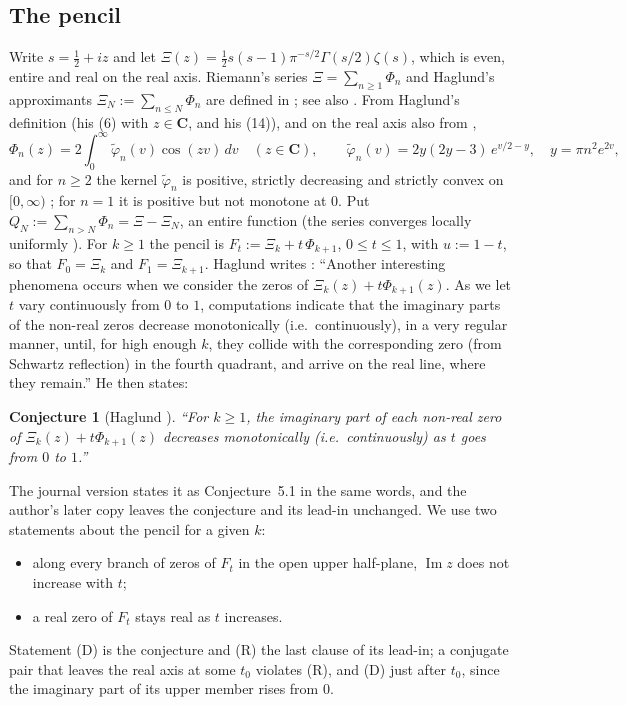 \documentclass[11pt]{article}
\theoremstyle{plain}
\newtheorem{conjecture}{Conjecture}
\theoremstyle{definition}
\theoremstyle{remark}
\newcommand{\Cx}{\mathbf{C}}
\newcommand{\im}{\operatorname{Im}}
\newcommand{\tphi}{\widetilde{\varphi}}
\begin{document}
\subsection{The pencil}\label{sec:pencil}
Write $s = \tfrac12 + iz$ and let
$\Xi(z) = \tfrac12 s(s-1)\pi^{-s/2}\Gamma(s/2)\zeta(s)$, which is even, entire
and real on the real axis. Riemann's series $\Xi = \sum_{n\ge1}\Phi_n$ and
Haglund's approximants $\Xi_N := \sum_{n \le N}\Phi_n$ are defined in
\cite[(1)--(14), pp.~1--3]{Hag}; see also \cite[(3)]{Tya}. From Haglund's definition (his (6) with
$z \in \Cx$, and his (14)), and on the real axis also from
\cite[Theorem~3.3 and its proof]{Tya},
\begin{equation}\label{eq:kernel}
\Phi_n(z) = 2\int_0^\infty \tphi_n(v)\cos(zv)\,dv \quad (z \in \Cx), \qquad
\tphi_n(v) = 2y(2y-3)\,e^{v/2 - y}, \quad y = \pi n^2 e^{2v},
\end{equation}
and for $n \ge 2$ the kernel $\tphi_n$ is positive, strictly decreasing and
strictly convex on $[0,\infty)$ \cite[proof of Theorem~3.3]{Tya}; for $n = 1$
it is positive but not monotone at $0$. Put
$Q_N := \sum_{n > N}\Phi_n = \Xi - \Xi_N$, an entire function (the series
converges locally uniformly \cite[(12)]{Hag}). For $k \ge 1$ the pencil is
$F_t := \Xi_k + t\,\Phi_{k+1}$, $0 \le t \le 1$, with $u := 1 - t$, so that
$F_0 = \Xi_k$ and $F_1 = \Xi_{k+1}$. Haglund writes \cite[p.~11]{Hag}:
``Another interesting phenomena occurs when we consider the zeros of
$\Xi_k(z) + t\Phi_{k+1}(z)$. As we let $t$ vary continuously from $0$ to $1$,
computations indicate that the imaginary parts of the non-real zeros decrease
monotonically (i.e.\ continuously), in a very regular manner, until, for high
enough $k$, they collide with the corresponding zero (from Schwartz reflection)
in the fourth quadrant, and arrive on the real line, where they remain.'' He then
states:

\setcounter{conjecture}{3}
\begin{conjecture}[Haglund {\cite[p.~11]{Hag}}]\label{conj:4}
``For $k \ge 1$, the imaginary part of each non-real zero of
$\Xi_k(z) + t\Phi_{k+1}(z)$ decreases monotonically (i.e.\ continuously) as $t$
goes from $0$ to $1$.''
\end{conjecture}

The journal version \cite[p.~310]{HagJ} states it as Conjecture~5.1 in the same
words, and the author's later copy \cite[p.~11]{HagW} leaves the conjecture and
its lead-in unchanged. We use two statements about the pencil for a given $k$:
\begin{itemize}
\item[(D)] along every branch of zeros of $F_t$ in the open upper half-plane,
$\im z$ does not increase with $t$;
\item[(R)] a real zero of $F_t$ stays real as $t$ increases.
\end{itemize}
Statement (D) is the conjecture and (R) the last clause of its lead-in; a
conjugate pair that leaves the real axis at some $t_0$ violates (R), and (D)
just after $t_0$, since the imaginary part of its upper member rises from $0$.
\end{document}
